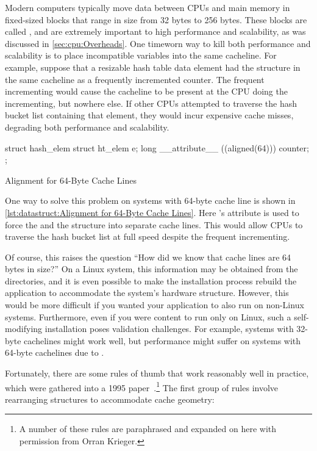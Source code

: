 Modern computers typically move data between CPUs and main memory in
fixed-sized blocks that range in size from 32 bytes to 256 bytes.
These blocks are called \emph{}, and are extremely important
to high performance and scalability, as was discussed in
\cref{sec:cpu:Overheads}.
One timeworn way to kill both performance and scalability is to
place incompatible variables into the same cacheline.
For example, suppose that a resizable hash table data element had
the  structure in the same cacheline as a frequently incremented
counter.
The frequent incrementing would cause the cacheline to be present at
the CPU doing the incrementing, but nowhere else.
If other CPUs attempted to traverse the hash bucket list containing
that element, they would incur expensive cache misses, degrading both
performance and scalability.

\begin{listing}
\begin{VerbatimL}
struct hash_elem {
	struct ht_elem e;
	long __attribute__ ((aligned(64))) counter;
};
\end{VerbatimL}
\caption{Alignment for 64-Byte Cache Lines}
\label{lst:datastruct:Alignment for 64-Byte Cache Lines}
\end{listing}

One way to solve this problem on systems with 64-byte cache line is shown in
\cref{lst:datastruct:Alignment for 64-Byte Cache Lines}.
Here \GCC's  attribute is used to force the 
and the  structure into separate cache lines.
This would allow CPUs to traverse the hash bucket list at full speed
despite the frequent incrementing.

Of course, this raises the question ``How did we know that cache lines
are 64 bytes in size?''
On a Linux system, this information may be obtained from the
 directories, and it is even
possible to make the installation process rebuild the application to
accommodate the system's hardware structure.
However, this would be more difficult if you wanted your application to
also run on non-Linux systems.
Furthermore, even if you were content to run only on Linux, such a
self-modifying installation poses validation challenges.
For example, systems with 32-byte cachelines might work well, but
performance might suffer on systems with 64-byte cachelines due
to .

Fortunately, there are some rules of thumb that work reasonably well in
practice, which were gathered into a 1995
paper~\cite{BenjaminGamsa95a}.\footnote{
	A number of these rules are paraphrased and expanded on here
	with permission from Orran Krieger.}
The first group of rules involve rearranging structures to accommodate
cache geometry:

